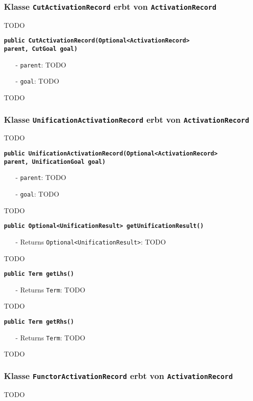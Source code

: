 \documentclass[parskip=full,11pt,twoside]{scrartcl}
\begin{document}
\subsubsection{Klasse \texttt{CutActivationRecord} erbt von \texttt{ActivationRecord}}
TODO

\textbf{\texttt{public CutActivationRecord(Optional<ActivationRecord>\\ parent, CutGoal goal)}}
\begin{itemize}[noitemsep]
	\item[-] \texttt{parent}: TODO
	\item[-] \texttt{goal}: TODO
\end{itemize}
TODO

\subsubsection{Klasse \texttt{UnificationActivationRecord} erbt von \texttt{ActivationRecord}}
TODO

\textbf{\texttt{public UnificationActivationRecord(Optional<ActivationRecord>\\ parent, UnificationGoal goal)}}
\begin{itemize}[noitemsep]
	\item[-] \texttt{parent}: TODO
	\item[-] \texttt{goal}: TODO
\end{itemize}
TODO

\textbf{\texttt{public Optional<UnificationResult> getUnificationResult()}}
\begin{itemize}[noitemsep]
	\item[-] Returns \texttt{Optional<UnificationResult>}: TODO
\end{itemize}
TODO

\textbf{\texttt{public Term getLhs()}}
\begin{itemize}[noitemsep]
	\item[-] Returns \texttt{Term}: TODO
\end{itemize}
TODO

\textbf{\texttt{public Term getRhs()}}
\begin{itemize}[noitemsep]
	\item[-] Returns \texttt{Term}: TODO
\end{itemize}
TODO

\subsubsection{Klasse \texttt{FunctorActivationRecord} erbt von \texttt{ActivationRecord}}
TODO
\end{document}
